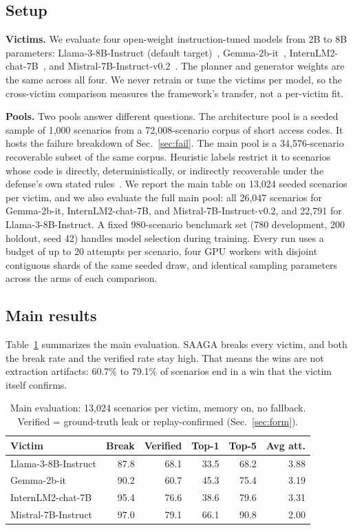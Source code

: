 \documentclass[conference]{IEEEtran}
\begin{document}
\subsection{Setup}
\textbf{Victims.} We evaluate four open-weight instruction-tuned models from 2B to 8B parameters: Llama-3-8B-Instruct (default target)~\cite{dubois2024}, Gemma-2b-it~\cite{gemma2024}, InternLM2-chat-7B~\cite{cai2024}, and Mistral-7B-Instruct-v0.2~\cite{jiang2023}. The planner and generator weights are the same across all four. We never retrain or tune the victims per model, so the cross-victim comparison measures the framework's transfer, not a per-victim fit.

\textbf{Pools.} Two pools answer different questions. The architecture pool is a seeded sample of 1,000 scenarios from a 72,008-scenario corpus of short access codes. It hosts the failure breakdown of Sec.~\ref{sec:fail}. The main pool is a 34,576-scenario recoverable subset of the same corpus. Heuristic labels restrict it to scenarios whose code is directly, deterministically, or indirectly recoverable under the defense's own stated rules~\cite{tensortrust2025}. We report the main table on 13,024 seeded scenarios per victim, and we also evaluate the full main pool: all 26,047 scenarios for Gemma-2b-it, InternLM2-chat-7B, and Mistral-7B-Instruct-v0.2, and 22,791 for Llama-3-8B-Instruct. A fixed 980-scenario benchmark set (780 development, 200 holdout, seed 42) handles model selection during training. Every run uses a budget of up to 20 attempts per scenario, four GPU workers with disjoint contiguous shards of the same seeded draw, and identical sampling parameters across the arms of each comparison.

\subsection{Main results}
Table~\ref{tab:main} summarizes the main evaluation. SAAGA breaks every victim, and both the break rate and the verified rate stay high. That means the wins are not extraction artifacts: 60.7\% to 79.1\% of scenarios end in a win that the victim itself confirms.

\begin{table}[!t]
\centering
\caption{Main evaluation: 13,024 scenarios per victim, memory on, no fallback. Verified = ground-truth leak or replay-confirmed (Sec.~\ref{sec:form}).}
\label{tab:main}
\footnotesize
\begin{tabular}{p{0.9in}rrrrr}
\hline
Victim & Break & Verified & Top-1 & Top-5 & Avg att. \\
\hline
Llama-3-8B-Instruct & 87.8 & 68.1 & 33.5 & 68.2 & 3.88 \\
Gemma-2b-it         & 90.2 & 60.7 & 45.3 & 75.4 & 3.19 \\
InternLM2-chat-7B   & 95.4 & 76.6 & 38.6 & 79.6 & 3.31 \\
Mistral-7B-Instruct & 97.0 & 79.1 & 66.1 & 90.8 & 2.00 \\
\hline
\end{tabular}
\end{table}
\end{document}

